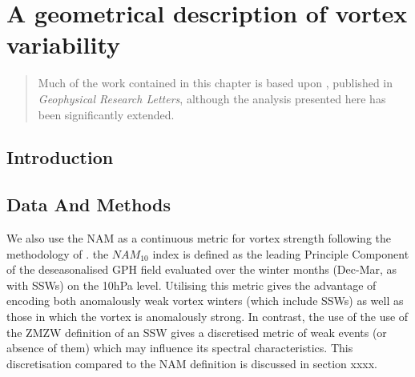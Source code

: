 \chapter{A geometrical description of vortex variability}
\begin{quotation}
  Much of the work contained in this chapter is based upon \citet{Seviour2013},
  published in \emph{Geophysical Research Letters}, although the analysis
  presented here has been significantly extended.
\end{quotation}

\label{cha:moments}


\section{Introduction}



\section{Data And Methods}

We also use the NAM as a continuous metric for vortex strength following the methodology of \cite{baldwinStratospheric2001}. the $NAM_{10}$ index is defined as the leading Principle Component of the deseasonalised GPH field evaluated over the winter months (Dec-Mar, as with SSWs) on the 10hPa level. Utilising this metric gives the advantage of encoding both anomalously weak vortex winters (which include SSWs) as well as those in which the vortex is anomalously strong. In contrast, the use of the use of the ZMZW definition of an SSW gives a discretised metric of weak events (or absence of them) which may influence its spectral characteristics. This discretisation compared to the NAM definition is discussed in section xxxx.










